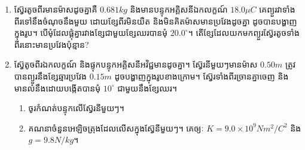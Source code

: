 \begin{enumerate}[m]
	\item ស៊្វែរតូចពីរមានម៉ាសដូចគ្នាគឺ $0.681kg$ និងមានបន្ទុកអគ្គិសនីឯកលក្ខណ៍ $18.0\mu C$ គេព្យួរវាទាំងពីរទៅនឹងចំណុចនឹងមួយ ដោយខ្សែពីរមិនយឺត និងមិនគិតម៉ាសមានប្រវែងដូចគ្នា ដូចបានបង្ហាញក្នុងរូប។ បើមុំដែលផ្គុំគ្នារវាងខ្សែជាមួយខ្សែឈរបានមុំ $20.0^\circ$។ តើខ្សែដែលយកមកព្យួរស៊្វែរតូចទាំងពីរនោះមានប្រវែងប៉ុន្មាន?
	\item ស៊្វែតូចពីរឯកលក្ខណ៍ និងផ្ទុកបន្ទុកអគ្គិសនីអវិជ្ជមានដូចគ្នា។ ស៊្វែរនីមួយៗមានម៉ាស $0.50m$ ត្រូវបានព្យួរនឹងខ្សែឆ្មារប្រវែង $0.15m$ ដូចបង្ហាញក្នុងរូបខាងក្រោម។ ស៊្វែរទាំងពីរច្រានគ្នាចេញ និងមានលំនឹងដោយបង្កើតបានមុំ $10^\circ$ ជាមួយនឹងខ្សែឈរ។
	\begin{enumerate}
		\item ចូរកំណត់បន្ទុកលើស៊្វែរនីមួយៗ។
		\item គណនាចំនួនអេឡិចត្រុងដែលលើសក្នុងស៊្វែនីមួយៗ។ គេឲ្យៈ $K=9.0\times10^{9}Nm^{2}/C^{2}$ និង $g=9.8N/kg$។ 
	\end{enumerate}  
		\begin{figure}[H]
		\centering
\end{figure}
\end{enumerate}
